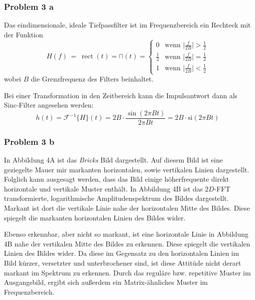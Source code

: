 \subsubsection{Problem 3 a}
Das eindimensionale, ideale Tiefpassfilter ist im Frequenzbereich ein Rechteck mit der Funktion \begin{equation*}
H(f)\ =\ \operatorname{rect}(t) = \sqcap(t) = \begin{cases}
0           & \text{wenn } \big|\frac{f}{2B}\big| > \frac{1}{2} \\[3pt]
\frac{1}{2} & \mbox{wenn } \big|\frac{f}{2B}\big| = \frac{1}{2} \\[3pt]
1           & \text{wenn } \big|\frac{f}{2B}\big| < \frac{1}{2}
\end{cases}
\end{equation*} wobei $B$ die Grenzfrequenz des Filters beinhaltet.

Bei einer Transformation in den Zeitbereich kann die Impulsantwort dann als Sinc-Filter angesehen werden: \begin{equation*}
    h(t) = \mathcal{F}^{-1} \{ H \}(t) = 2B\cdot \frac{\sin(2\pi Bt)}{2\pi Bt} = 2B\cdot \mathrm{si}(2\pi Bt)
\end{equation*}


\subsubsection{Problem 3 b}
In Abbildung 4A ist das \textit{Bricks} Bild dargestellt. Auf diesem Bild ist eine geziegelte Mauer mir markanten horizontalen, sowie vertikalen Linien dargestellt. Folglich kann ausgesagt werden, dass das Bild einige höherfrequente direkt horizontale und vertikale Muster enthält. In Abbildung 4B ist das $2D$-FFT transformierte, logarithmische Amplitudenspektrum des Bildes dargestellt. Markant ist dort die vertikale Linie nahe der horizontalen Mitte des Bildes. Diese spiegelt die markanten horizontalen Linien des Bildes wider.

Ebenso erkennbar, aber nicht so markant, ist eine horizontale Linie in Abbildung 4B nahe der vertikalen Mitte des Bildes zu erkennen. Diese spiegelt die vertikalen Linien des Bildes wider. Da diese im Gegensatz zu den horizontalen Linien im Bild kürzer, versetzter und unterbrochener sind, ist diese Attitüde nicht derart markant im Spektrum zu erkennen. Durch das reguläre bzw. repetitive Muster im Ausgangsbild, ergibt sich außerdem ein Matrix-ähnliches Muster im Frequenzbereich. 

